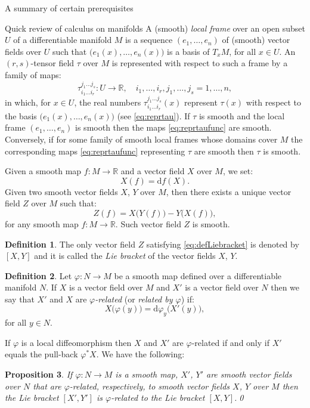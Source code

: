 \documentclass[oneside,a4paper,11pt]{amsbook}
\newcommand{\R}{\mathds R}
\newcommand{\dd}{\mathrm d}
\theoremstyle{remark}\newtheorem{exercise}{Exercise}[chapter]
\theoremstyle{plain}\newtheorem{teo}{Theorem}[section]
\theoremstyle{plain}\newtheorem{lem}[teo]{Lemma}
\theoremstyle{plain}\newtheorem{prop}[teo]{Proposition}
\theoremstyle{plain}\newtheorem{cor}[teo]{Corollary}
\theoremstyle{definition}\newtheorem{defin}[teo]{Definition}
\theoremstyle{remark}\newtheorem{rem}[teo]{Remark}
\theoremstyle{definition}\newtheorem{notation}[teo]{Notation}
\theoremstyle{definition}\newtheorem{convention}[teo]{Convention}
\theoremstyle{definition}\newtheorem{example}[teo]{Example}
\numberwithin{section}{chapter}
\numberwithin{equation}{section}
\begin{document}
\begin{chapter}{A summary of certain prerequisites}
\begin{section}{Quick review of calculus on manifolds}
A (smooth) {\em local frame\/} over an open subset $U$ of a differentiable manifold $M$ is a sequence $(e_1,\ldots,e_n)$ of (smooth) vector fields
over $U$ such that $\big(e_1(x),\ldots,e_n(x)\big)$ is a basis of $T_xM$, for all $x\in U$. An $(r,s)$-tensor field $\tau$ over $M$ is
represented with respect to such a frame by a family of maps:
\begin{equation}\label{eq:reprtaufunc}
\tau_{i_1\ldots i_r}^{j_1\ldots j_s}:U\longrightarrow\R,\quad i_1,\ldots,i_r,j_1,\ldots,j_s=1,\ldots,n,
\end{equation}
in which, for $x\in U$, the real numbers $\tau_{i_1\ldots i_r}^{j_1\ldots j_s}(x)$ represent $\tau(x)$ with respect to the basis
$\big(e_1(x),\ldots,e_n(x)\big)$ (see \eqref{eq:reprtau}). If $\tau$ is smooth and the local frame $(e_1,\ldots,e_n)$ is smooth
then the maps \eqref{eq:reprtaufunc} are smooth. Conversely, if for some family
of smooth local frames whose domains cover $M$ the corresponding maps \eqref{eq:reprtaufunc} representing $\tau$ are
smooth then $\tau$ is smooth.

\medskip

Given a smooth map $f:M\to\R$ and a vector field $X$ over $M$, we set:
\[X(f)=\dd f(X).\]
Given two smooth vector fields $X$, $Y$ over $M$, then there exists a unique vector field
$Z$ over $M$ such that:
\begin{equation}\label{eq:defLiebracket}
Z(f)=X\big(Y(f)\big)-Y\big(X(f)\big),
\end{equation}
for any smooth map $f:M\to\R$. Such vector field $Z$ is smooth.

\begin{defin}
The only vector field $Z$ satisfying \eqref{eq:defLiebracket} is denoted by $[X,Y]$ and it
is called the {\em Lie bracket\/} of the vector fields $X$, $Y$.
\end{defin}

\begin{defin}\label{thm:phirelated}
Let $\varphi:N\to M$ be a smooth map defined over a differentiable manifold $N$. If $X$ is a vector field over $M$ and $X'$ is a vector field over
$N$ then we say that $X'$ and $X$ are {\em $\varphi$-related\/} (or {\em related by $\varphi$}) if:
\[X\big(\varphi(y)\big)=\dd\varphi_y\big(X'(y)\big),\]
for all $y\in N$.
\end{defin}
If $\varphi$ is a local diffeomorphism then $X$ and $X'$ are $\varphi$-related if and only if $X'$ equals the pull-back $\varphi^*X$. We have the following:

\begin{prop}\label{thm:brackphirel}
If $\varphi:N\to M$ is a smooth map, $X'$, $Y'$ are smooth vector fields over $N$ that are $\varphi$-related, respectively, to smooth vector fields
$X$, $Y$ over $M$ then the Lie bracket $[X',Y']$ is $\varphi$-related to the Lie bracket $[X,Y]$.\qed
\end{prop}


\end{section}
\end{chapter}
\end{document}
